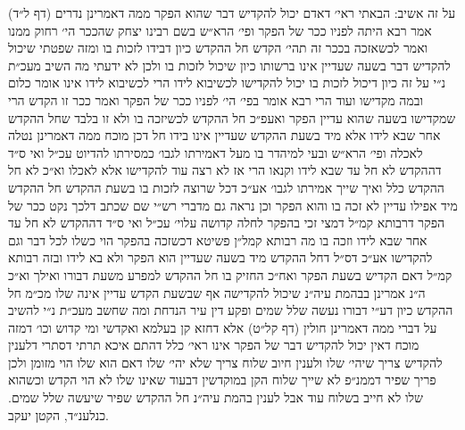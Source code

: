 \documentclass[12pt, openany]{book}
\begin{document}
\begin{multicols}{2}
על זה אשיב: הבאתי ראי׳ דאדם יכול להקדיש דבר שהוא הפקר ממה דאמרינן נדרים (דף ל״ד) אמר רבא היתה לפניו ככר של הפקר ופי׳ הרא״ש בשם רבינו יצחק שהככר הי׳ רחוק ממנו ואמר לכשאזכה בככר זה תהי׳ הקדש חל ההקדש כיון דבידו לזכות בו ומזה שפטתי שיכול להקדיש דבר בשעה שעדיין אינו ברשותו כיון שיכול לזכות בו ולכן לא ידעתי מה השיב מעכ״ת נ״י על זה כיון דיכול לזכות בו יכול להקדישו לכשיבוא לידו הרי לכשיבוא לידו אינו אומר כלום ובמה מקדישו ועוד הרי רבא אומר בפי׳ הי׳ לפניו ככר של הפקר ואמר ככר זו הקדש הרי שמקדישו בשעה שהוא עדיין הפקר ואעפ״כ חל ההקדש לכשיזכה בו ולא זו בלבד שחל ההקדש אחר שבא לידו אלא מיד בשעת ההקדש שעדיין אינו בידו חל דכן מוכח ממה דאמרינן נטלה לאכלה ופי׳ הרא״ש ובעי למיהדר בו מעל דאמירתו לגבו׳ כמסירתו להדיוט עכ״ל ואי ס״ד דההקדש לא חל עד שבא לידו וקנאו הרי אז לא רצה עוד להקדישו אלא לאכלו וא״כ לא חל ההקדש כלל ואיך שייך אמירתו לגבו׳ אע״כ דכל שרוצה לזכות בו בשעת ההקדש חל ההקדש מיד אפילו עדיין לא זכה בו והוא הפקר וכן נראה גם מדברי רש״י שם שכתב דלכך נקט ככר של הפקר דרבותא קמ״ל דמצי זכי בהפקר לחלה קדושה עלוי׳ עכ״ל ואי ס״ד דההקדש לא חל עד אחר שבא לידו וזכה בו מה רבותא קמל״ן פשיטא דכשזכה בהפקר הוי כשלו לכל דבר וגם להקדישו אע״כ דס״ל דחל ההקדש מיד בשעה שעדיין הוא הפקר ולא בא לידו ובזה רבותא קמ״ל דאם הקדיש בשעת הפקר ואח״כ החזיק בו חל ההקדש למפרע משעת דבורו ואילך וא״כ ה״נ אמרינן בבהמת עיה״נ שיכול להקדישה אף שבשעת הקדש עדיין אינה שלו מכ״מ חל ההקדש כיון דע״י דבורו נעשה שלל שמים ופקע דין עיר הנדחת ומה שחשב מעכ״ת נ״י להשיב על דברי ממה דאמרינן חולין (דף קל״ט) אלא דחזא קן בעלמא ואקדשי ומי קדוש וכו׳ דמזה מוכח דאין יכול להקדיש דבר של הפקר אינו ראי׳ כלל דהתם איכא תרתי דסתרי דלענין להקדיש צריך שיהי׳ שלו ולענין חיוב שלוח צריך שלא יהי׳ שלו דאם הוא שלו הוי מזומן ולכן פריך שפיר דממנ״פ לא שייך שלוח הקן במוקדשין דבעוד שאינו שלו לא הוי הקדש וכשהוא שלו לא חייב בשלוח עוד אבל לענין בהמת עיה״נ חל ההקדש שפיר שיעשה שלל שמים. כנלענ״ד, הקטן יעקב.\\\vspace{0pt}

\end{multicols}\newpage
\end{document}
